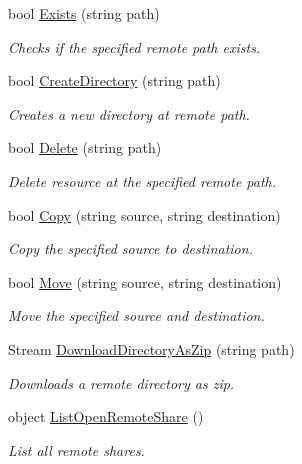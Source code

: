 \begin{DoxyCompactItemize}
bool \hyperlink{classowncloudsharp_1_1_client_a6f2160610e85aa278d235be8ba613bbd}{Exists} (string path)
\begin{DoxyCompactList}\small\item\em Checks if the specified remote path exists. \end{DoxyCompactList}\item 
bool \hyperlink{classowncloudsharp_1_1_client_a7fa222eebf65ff47a05056b2182c1669}{Create\+Directory} (string path)
\begin{DoxyCompactList}\small\item\em Creates a new directory at remote path. \end{DoxyCompactList}\item 
bool \hyperlink{classowncloudsharp_1_1_client_a6465df479d098af428bc9bcdd2edbc7f}{Delete} (string path)
\begin{DoxyCompactList}\small\item\em Delete resource at the specified remote path. \end{DoxyCompactList}\item 
bool \hyperlink{classowncloudsharp_1_1_client_ad20dcb23c0158e491d54401b2809b903}{Copy} (string source, string destination)
\begin{DoxyCompactList}\small\item\em Copy the specified source to destination. \end{DoxyCompactList}\item 
bool \hyperlink{classowncloudsharp_1_1_client_a2ea83b74c926b1ff7a8443f75bf4ebd2}{Move} (string source, string destination)
\begin{DoxyCompactList}\small\item\em Move the specified source and destination. \end{DoxyCompactList}\item 
Stream \hyperlink{classowncloudsharp_1_1_client_aa5b9f5fb73514eeee4242d57605bdcd5}{Download\+Directory\+As\+Zip} (string path)
\begin{DoxyCompactList}\small\item\em Downloads a remote directory as zip. \end{DoxyCompactList}\item 
object \hyperlink{classowncloudsharp_1_1_client_a47f02b74f8beb72a312ff92a07636096}{List\+Open\+Remote\+Share} ()
\begin{DoxyCompactList}\small\item\em List all remote shares. \end{DoxyCompactList}\item 

\end{DoxyCompactItemize}
